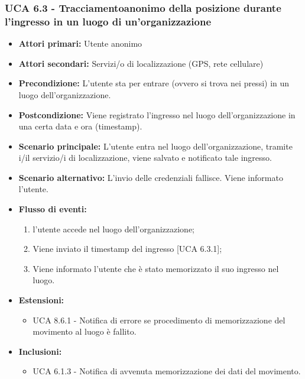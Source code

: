 \subsubsection{UCA 6.3 - Tracciamentoanonimo della posizione durante l'ingresso in un luogo di un'organizzazione}
\begin{itemize}
	\item \textbf{Attori primari:} Utente anonimo
	\item \textbf{Attori secondari:} Servizi/o di localizzazione (GPS, rete cellulare)
	\item \textbf{Precondizione:} L'utente sta per entrare (ovvero si trova nei pressi) in un luogo dell'organizzazione.
	\item \textbf{Postcondizione:} Viene registrato l'ingresso nel luogo dell'organizzazione in una certa data e ora (timestamp).
	\item \textbf{Scenario principale:} L'utente entra nel luogo dell'organizzazione, tramite i/il servizio/i di localizzazione, viene salvato e notificato tale ingresso.
	\item \textbf{Scenario alternativo:} L'invio delle credenziali fallisce. Viene informato l'utente.
	\item \textbf{Flusso di eventi:}
	\begin{enumerate}
		\item l'utente accede nel luogo dell'organizzazione;
		\item Viene inviato il timestamp del ingresso [UCA 6.3.1];
		\item Viene informato l'utente che è stato memorizzato il suo ingresso nel luogo.
	\end{enumerate}
	\item \textbf{Estensioni:}
	\begin{itemize}
		\item UCA 8.6.1 - Notifica di errore se procedimento di memorizzazione del movimento al luogo è fallito.
	\end{itemize}
	\item \textbf{Inclusioni:}
	\begin{itemize}
		\item UCA 6.1.3 - Notifica di avvenuta memorizzazione dei dati del movimento.
	\end{itemize}
\end{itemize}

